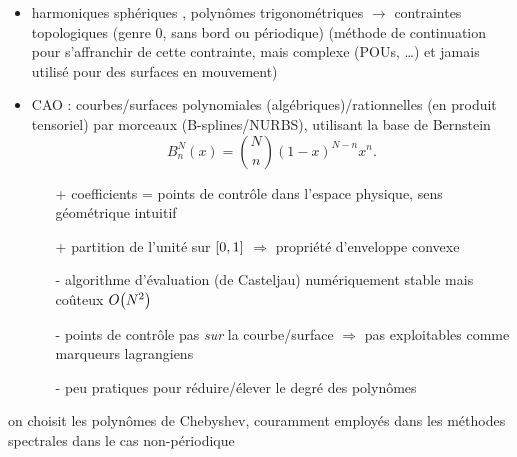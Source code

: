 \begin{itemize}
	\item harmoniques sphériques \cite{veerapaneni2011}, polynômes trigonométriques \cite{gueyffier2015} $\to$ contraintes topologiques (genre 0, sans bord ou périodique) (méthode de continuation \cite{bruno2007} pour s'affranchir de cette contrainte, mais complexe (POUs, \ldots) et jamais utilisé pour des surfaces en mouvement)
	\item CAO : courbes/surfaces polynomiales (algébriques)/rationnelles (en produit tensoriel) par morceaux (B-splines/NURBS), utilisant la base de Bernstein
	\begin{equation}
		B_n^N(x) = \binom{N}{n} \left( 1 - x \right)^{N-n} x^n.
	\end{equation}
	\begin{itemize}
		\item[+] coefficients = points de contrôle dans l'espace physique, sens géométrique intuitif
		\item[+] partition de l'unité sur $\left[ 0, 1 \right]$ $\Rightarrow$ propriété d'enveloppe convexe
		\item[-] algorithme d'évaluation (de Casteljau) numériquement stable mais coûteux $O\!\left( {N^2} \right)$
		\item[-] points de contrôle pas \emph{sur} la courbe/surface $\Rightarrow$ pas exploitables comme marqueurs lagrangiens
		\item[-] peu pratiques pour réduire/élever le degré des polynômes
	\end{itemize}
\end{itemize}
\bigskip
on choisit les polynômes de Chebyshev\footnotemark, couramment employés dans les méthodes spectrales dans le cas non-périodique



